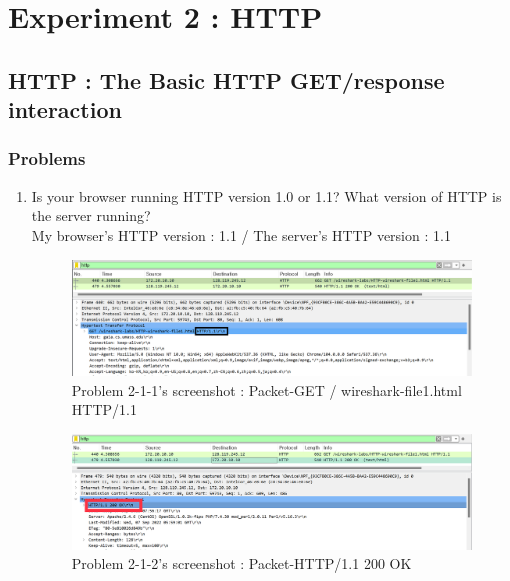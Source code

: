 \section{Experiment 2 : HTTP}
\subsection{HTTP : The Basic HTTP GET/response interaction}
    \subsubsection*{Problems}
    \begin{enumerate}[label=\bfseries Problem \arabic*:,leftmargin=*,labelindent=1em]
        \item Is your browser running HTTP version 1.0 or 1.1? What version of HTTP is the server running?\\[0.2mm]
            \soln My browser's HTTP version : 1.1 / The server's HTTP version : 1.1
            \vspace{-2mm}  
            \begin{figure}[!h]\centering
            \hspace{10mm} 
        		\includegraphics[width=.78\textwidth]{image/result_week01/Q2-1-1.png}
        		\caption{\footnotesize Problem 2-1-1's screenshot : Packet-GET / wireshark-file1.html HTTP/1.1}
        		\vspace{-10pt}
            \end{figure}
            \begin{figure}[!h]\centering
            \hspace{10mm} 
        		\includegraphics[width=.79\textwidth]{image/result_week01/Q2-1-2.png}
        		\caption{\footnotesize Problem 2-1-2's screenshot : Packet-HTTP/1.1 200 OK}
        		\vspace{-10pt}
            \end{figure}
            

\end{enumerate}
